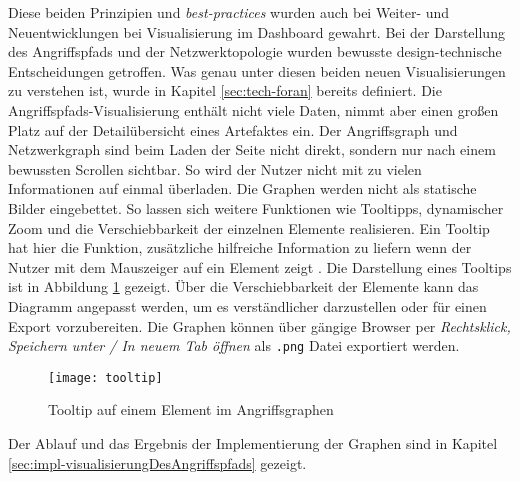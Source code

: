 \par Diese beiden Prinzipien und \textit{best-practices} wurden auch bei Weiter- und Neuentwicklungen bei Visualisierung im Dashboard gewahrt. Bei der Darstellung des Angriffspfads und der Netzwerktopologie wurden bewusste design-technische Entscheidungen getroffen. Was genau unter diesen beiden neuen Visualisierungen zu verstehen ist, wurde in Kapitel \ref{sec:tech-foran}  bereits definiert. Die Angriffspfads-Visualisierung enthält nicht viele Daten, nimmt aber einen großen Platz auf der Detailübersicht eines Artefaktes ein. Der Angriffsgraph und Netzwerkgraph sind beim Laden der Seite nicht direkt, sondern nur nach einem bewussten Scrollen sichtbar. So wird der Nutzer nicht mit zu vielen Informationen auf einmal überladen. Die Graphen werden nicht als statische Bilder eingebettet. So lassen sich weitere Funktionen wie Tooltipps, dynamischer Zoom und die Verschiebbarkeit der einzelnen Elemente realisieren. Ein Tooltip hat hier die Funktion, zusätzliche hilfreiche Information zu liefern wenn der Nutzer mit dem Mauszeiger auf ein Element zeigt \autocite{TooltipCarbonDesign}. Die Darstellung eines Tooltips ist in Abbildung \ref{fig:tooltip} gezeigt. Über die Verschiebbarkeit der Elemente kann das Diagramm angepasst werden, um es verständlicher darzustellen oder für einen Export vorzubereiten. Die Graphen können über gängige Browser per \textit{Rechtsklick, Speichern unter / In neuem Tab öffnen} als \verb|.png| Datei exportiert werden.
%
\begin{figure}[H]
    \centering
    \texttt{[image: tooltip]}
    \caption{Tooltip auf einem Element im Angriffsgraphen}
    \label{fig:tooltip}
\end{figure}
%
\par Der Ablauf und das Ergebnis der Implementierung der Graphen sind in Kapitel \ref{sec:impl-visualisierungDesAngriffspfads} gezeigt.
